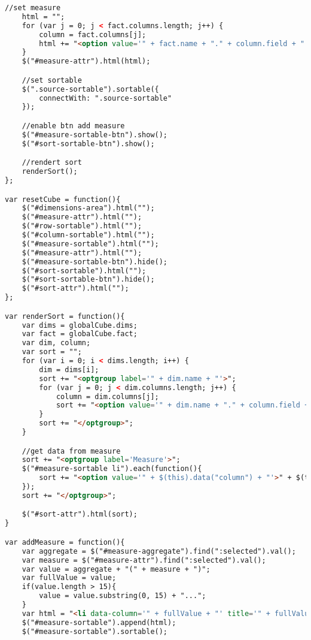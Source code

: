 \begin{lstlisting}[language=HTML,basicstyle=\tiny,caption=script.js]
    //set measure
    html = "";
    for (var j = 0; j < fact.columns.length; j++) {
        column = fact.columns[j];
        html += "<option value='" + fact.name + "." + column.field + "'>" + column.field + "</option>";
    }
    $("#measure-attr").html(html);

    //set sortable
    $(".source-sortable").sortable({
        connectWith: ".source-sortable"
    });

    //enable btn add measure
    $("#measure-sortable-btn").show();
    $("#sort-sortable-btn").show();

    //rendert sort
    renderSort();
};

var resetCube = function(){
    $("#dimensions-area").html("");
    $("#measure-attr").html("");
    $("#row-sortable").html("");
    $("#column-sortable").html("");
    $("#measure-sortable").html("");
    $("#measure-attr").html("");
    $("#measure-sortable-btn").hide();
    $("#sort-sortable").html("");
    $("#sort-sortable-btn").hide();
    $("#sort-attr").html("");
};

var renderSort = function(){
    var dims = globalCube.dims;
    var fact = globalCube.fact;
    var dim, column;
    var sort = "";
    for (var i = 0; i < dims.length; i++) {
        dim = dims[i];
        sort += "<optgroup label='" + dim.name + "'>";
        for (var j = 0; j < dim.columns.length; j++) {
            column = dim.columns[j];
            sort += "<option value='" + dim.name + "." + column.field + "'>" + column.field + "</option>";
        }
        sort += "</optgroup>";
    }

    //get data from measure
    sort += "<optgroup label='Measure'>";
    $("#measure-sortable li").each(function(){
        sort += "<option value='" + $(this).data("column") + "'>" + $(this).data("column") + "</option>";
    });
    sort += "</optgroup>";

    $("#sort-attr").html(sort);
}

var addMeasure = function(){
    var aggregate = $("#measure-aggregate").find(":selected").val();
    var measure = $("#measure-attr").find(":selected").val();
    var value = aggregate + "(" + measure + ")";
    var fullValue = value;
    if(value.length > 15){
        value = value.substring(0, 15) + "...";
    }
    var html = "<li data-column='" + fullValue + "' title='" + fullValue + "'>" + value + " <a href='#' class='text text-danger' onclick='removeMeasure(this)'><span class='glyphicon glyphicon-remove'></span></a></li>";
    $("#measure-sortable").append(html);
    $("#measure-sortable").sortable();


\end{lstlisting}
